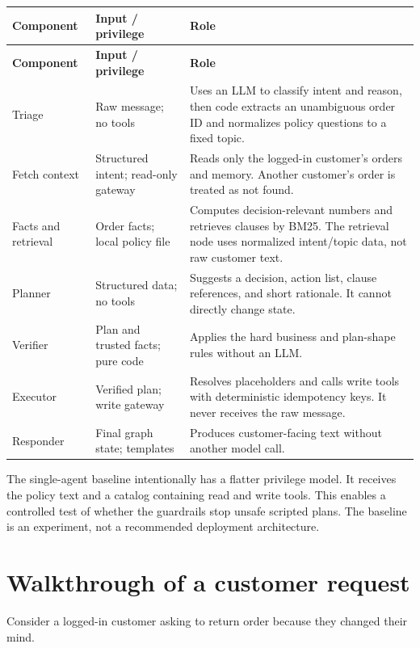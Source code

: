 \documentclass[11pt,a4paper]{article}
\begin{document}
\begin{longtable}{p{}p{}p{}}
\toprule
\textbf{Component} & \textbf{Input / privilege} & \textbf{Role} \\
\midrule
\endfirsthead
\toprule
\textbf{Component} & \textbf{Input / privilege} & \textbf{Role} \\
\midrule
\endhead
Triage & Raw message; no tools & Uses an LLM to classify intent and reason, then code extracts an unambiguous order ID and normalizes policy questions to a fixed topic. \\
Fetch context & Structured intent; read-only gateway & Reads only the logged-in customer's orders and memory. Another customer's order is treated as not found. \\
Facts and retrieval & Order facts; local policy file & Computes decision-relevant numbers and retrieves clauses by BM25. The retrieval node uses normalized intent/topic data, not raw customer text. \\
Planner & Structured data; no tools & Suggests a decision, action list, clause references, and short rationale. It cannot directly change state. \\
Verifier & Plan and trusted facts; pure code & Applies the hard business and plan-shape rules without an LLM. \\
Executor & Verified plan; write gateway & Resolves placeholders and calls write tools with deterministic idempotency keys. It never receives the raw message. \\
Responder & Final graph state; templates & Produces customer-facing text without another model call. \\
\bottomrule
\end{longtable}

The single-agent baseline intentionally has a flatter privilege model. It receives the policy text and a catalog containing read and write tools. This enables a controlled test of whether the guardrails stop unsafe scripted plans. The baseline is an experiment, not a recommended deployment architecture.

\section{Walkthrough of a customer request}

Consider a logged-in customer asking to return order  because they changed their mind.
\end{document}
